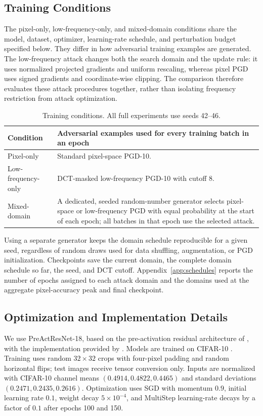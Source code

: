 \documentclass{article}
\begin{document}
\subsection{Training Conditions}
\label{sec:conditions}
The pixel-only, low-frequency-only, and mixed-domain conditions share the
model, dataset, optimizer, learning-rate schedule, and perturbation budget
specified below. They differ in how adversarial training examples are
generated. The low-frequency attack changes both the search domain and the
update rule: it uses normalized projected gradients and uniform rescaling,
whereas pixel PGD uses signed gradients and coordinate-wise clipping. The
comparison therefore evaluates these attack procedures together, rather than
isolating frequency restriction from attack optimization.

\begin{table}[t]
\centering
\caption{Training conditions. All full experiments use seeds 42--46.}
\label{tab:conditions}
\begin{tabularx}{\linewidth}{@{}lX@{}}
\toprule
Condition & Adversarial examples used for every training batch in an epoch \\
\midrule
Pixel-only & Standard pixel-space PGD-10. \\
Low-frequency-only & DCT-masked low-frequency PGD-10 with cutoff $8$. \\
Mixed-domain & A dedicated, seeded random-number generator selects pixel-space or
low-frequency PGD with equal probability at the start of each epoch; all
batches in that epoch use the selected attack. \\
\bottomrule
\end{tabularx}
\end{table}

Using a separate generator keeps the domain schedule reproducible for a given
seed, regardless of random draws used for data shuffling, augmentation, or
PGD initialization. Checkpoints save the current
domain, the complete domain schedule so far, the seed, and DCT cutoff.
Appendix~\ref{app:schedules} reports the number of epochs assigned to each
attack domain and the domains used at the aggregate pixel-accuracy peak and
final checkpoint.

\subsection{Optimization and Implementation Details}
\label{sec:implementation}
We use PreActResNet-18, based on the pre-activation residual architecture of
\citet{he2016}, with the implementation provided by \citet{rice2020}. Models
are trained on CIFAR-10
\citep{krizhevsky2009}. Training uses
random $32\times32$ crops with four-pixel padding and random horizontal flips;
test images receive tensor conversion only. Inputs are normalized with CIFAR-10
channel means $(0.4914,0.4822,0.4465)$ and standard deviations
$(0.2471,0.2435,0.2616)$. Optimization uses SGD with momentum $0.9$, initial
learning rate $0.1$, weight decay $5\times10^{-4}$, and MultiStep learning-rate
decays by a factor of $0.1$ after epochs 100 and 150.
\end{document}
